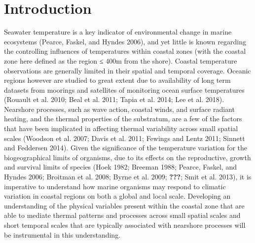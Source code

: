 \documentclass[12pt,a4paper,]{article}
\begin{document}
\newpage

\hypertarget{introduction}{%
\section{Introduction}\label{introduction}}

Seawater temperature is a key indicator of environmental change in
marine ecosystems (Pearce, Faskel, and Hyndes 2006), and yet little is
known regarding the controlling influences of temperatures within
coastal zones (with the coastal zone here defined as the region ≤ 400m
from the shore). Coastal temperature observations are generally limited
in their spatial and temporal coverage. Oceanic regions however are
studied to great extent due to availability of long term datasets from
moorings and satellites of monitoring ocean surface temperatures
(Rouault et al. 2010; Beal et al. 2011; Tapia et al. 2014; Lee et al.
2018). Nearshore processes, such as wave action, coastal winds, and
surface radiant heating, and the thermal properties of the substratum,
are a few of the factors that have been implicated in affecting thermal
variability across small spatial scales (Woodson et al. 2007; Davis et
al. 2011; Fewings and Lentz 2011; Sinnett and Feddersen 2014). Given the
significance of the temperature variation for the biogeographical limits
of organisms, due to its effects on the reproductive, growth and
survival limits of species (Hoek 1982; Breeman 1988; Pearce, Faskel, and
Hyndes 2006; Broitman et al. 2008; Byrne et al. 2009; {\textbf{???}};
Smit et al. 2013), it is imperative to understand how marine organisms
may respond to climatic variation in coastal regions on both a global
and local scale. Developing an understanding of the physical variables
present within the coastal zone that are able to mediate thermal
patterns and processes across small spatial scales and short temporal
scales that are typically associated with nearshore processes will be
instrumental in this understanding.
\end{document}
